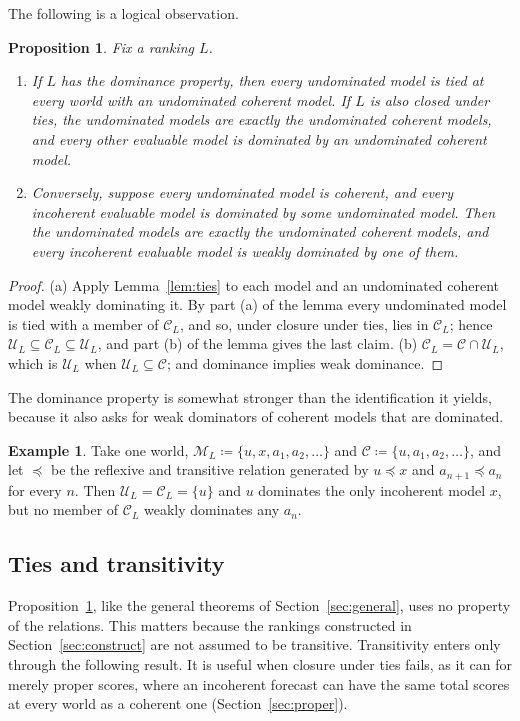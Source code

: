 \documentclass[11pt]{article}
\newtheorem{proposition}[theorem]{Proposition}
\theoremstyle{definition}
\newtheorem{example}[theorem]{Example}
\theoremstyle{remark}
\newcommand{\M}{\mathcal M}
\newcommand{\C}{\mathcal C}
\newcommand{\U}{\mathcal U}
\begin{document}
The following is a logical observation.
\begin{proposition}\label{prop:conclusion}
Fix a ranking $L$.
\begin{enumerate}[label=(\alph*)]
\item If $L$ has the dominance property, then every undominated model is tied at every world with an undominated coherent model. If $L$ is also closed under ties, the undominated models are exactly the undominated coherent models, and every other evaluable model is dominated by an undominated coherent model.
\item Conversely, suppose every undominated model is coherent, and every incoherent evaluable model is dominated by some undominated model. Then the undominated models are exactly the undominated coherent models, and every incoherent evaluable model is weakly dominated by one of them.
\end{enumerate}
\end{proposition}
\begin{proof}
(a) Apply Lemma~\ref{lem:ties} to each model and an undominated coherent model weakly dominating it. By part (a) of the lemma every undominated model is tied with a member of $\C_L$, and so, under closure under ties, lies in $\C_L$; hence $\U_L\subseteq\C_L\subseteq\U_L$, and part (b) of the lemma gives the last claim.
(b) $\C_L=\C\cap\U_L$, which is $\U_L$ when $\U_L\subseteq\C$; and dominance implies weak dominance.
\end{proof}

The dominance property is somewhat stronger than the identification it yields, because it also asks for weak dominators of coherent models that are dominated.
\begin{example}\label{ex:conclusion-stronger}
Take one world, $\M_L\coloneqq\{u,x,a_1,a_2,\dots\}$ and $\C\coloneqq\{u,a_1,a_2,\dots\}$, and let $\preceq$ be the reflexive and transitive relation generated by $u\preceq x$ and $a_{n+1}\preceq a_n$ for every $n$. Then $\U_L=\C_L=\{u\}$ and $u$ dominates the only incoherent model $x$, but no member of $\C_L$ weakly dominates any $a_n$.
\end{example}

\subsection{Ties and transitivity}
Proposition~\ref{prop:conclusion}, like the general theorems of Section~\ref{sec:general}, uses no property of the relations. This matters because the rankings constructed in Section~\ref{sec:construct} are not assumed to be transitive. Transitivity enters only through the following result. It is useful when closure under ties fails, as it can for merely proper scores, where an incoherent forecast can have the same total scores at every world as a coherent one (Section~\ref{sec:proper}).
\end{document}

